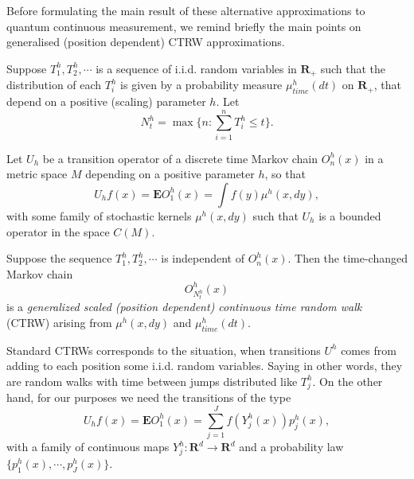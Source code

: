 \documentclass[12pt]{article}
\def\E{\mathbf{E}}
\def\R{\mathbf{R}}
\begin{document}
Before formulating the main result of these alternative approximations to quantum continuous measurement, we
remind briefly the main points on generalised (position dependent) CTRW approximations.

Suppose $T_1^h,T_2^h, \cdots $ is a sequence of i.i.d.
random variables in $\R_+$ such that the distribution of each $T_i^h$
is given by a probability measure $\mu_{time}^h (dt)$
on $\R_+$, that depend on a positive (scaling) parameter $h$. Let
\begin{equation}
\label{eqinversewalk}
N_t^h=\max \{ n: \sum_{i=1}^n T_i^h \le t\}.
\end{equation}

Let $U_h$ be a transition operator of a discrete time Markov chain
 $O^h_n(x)$ in a metric space $M$
depending on a positive parameter $h$, so that
\begin{equation}
\label{transitoperMar}
U_hf(x)=\E O^h_1(x)=\int f(y) \mu^h(x, dy),
\end{equation}
with some family of stochastic kernels  $\mu^h(x, dy)$ such that $U_h$
is a bounded operator in the space $C(M)$.

Suppose the sequence $T_1^h,T_2^h, \cdots $ is independent of $O^h_n(x)$.
Then the time-changed Markov chain
\begin{equation}
\label{ctrwposdep}
 O^h_{N_t^h}(x)
\end{equation}
is a {\it generalized scaled (position dependent)
 continuous time random walk} (CTRW) arising from
$\mu^h(x, dy)$ and $\mu^h_{time}(dt)$.

Standard CTRWs corresponds to the situation, when transitions $U^h$ comes from adding to each position
some i.i.d. random variables. Saying in other words, they are random walks
with time between jumps distributed like $T_j^h$. On the other hand, for our purposes we need
the transitions of the type
\[
U_hf(x)=\E O^h_1(x)=\sum_{j=1}^J  f(Y_j^h(x)) p_j^h(x),
\]
with a family of continuous maps $Y_j^h:\R^d\to \R^d$
and a probability law $\{p_1^h(x), \cdots, p_J^h(x)\}$.
\end{document}
